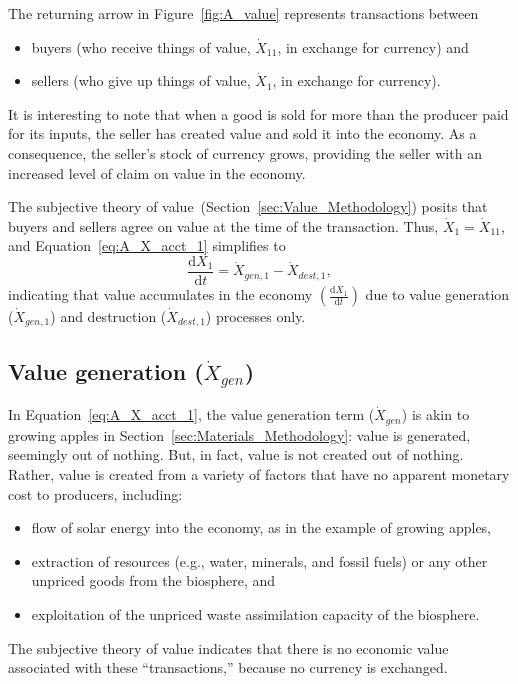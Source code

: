 The returning arrow in Figure~\ref{fig:A_value} 
represents transactions between 
\begin{itemize}
	\item{buyers (who receive things of value, $\dot{X}_{11}$,
	in exchange for currency) and}
	\item{sellers (who give up things of value, $\dot{X}_{1}$,
	in exchange for currency).}
\end{itemize}

It is interesting to note that when a good is sold for more
than the producer paid for its inputs, 
the seller has created value and sold it into the economy. 
As a consequence, the seller's stock of currency grows,
providing the seller with an increased level of claim 
on value in the economy.

The subjective theory of value~(Section~\ref{sec:Value_Methodology})
posits that buyers and sellers agree on value at the 
time of the transaction.
Thus, $\dot{X}_{1} = \dot{X}_{11}$, and Equation~\ref{eq:A_X_acct_1}
simplifies to
%
\begin{equation} \label{eq:A_X_acct_2}	
	\frac{\mathrm{d}X_{1}}{\mathrm{d}t}	
	= \dot{X}_{gen,1}
	- \dot{X}_{dest,1},
\end{equation}
%
indicating that value accumulates in the economy
$\left( \frac{\mathrm{d}X_{1}}{\mathrm{d}t} \right)$
due to value generation ($\dot{X}_{gen,1}$) 
and destruction ($\dot{X}_{dest,1}$) processes only.


\subsection[Value generation]{Value generation ($\dot{X}_{gen}$)}

\noindent In Equation~\ref{eq:A_X_acct_1}, 
the value generation term ($\dot{X}_{gen}$) is akin to growing apples
in Section~\ref{sec:Materials_Methodology}: 
value is generated, seemingly out of nothing.
But, in fact, value is not created out of nothing. 
Rather, value is created from a variety of factors that have no apparent 
monetary cost to producers, including:
%
\begin{itemize}
	\item{flow of solar energy
	into the economy,
	as in the example of growing apples,}
	
	\item{extraction of resources (e.g., water, minerals, and
	fossil fuels) or any other unpriced goods from the biosphere, and}
	
	\item{exploitation of the unpriced waste assimilation capacity of the biosphere.}
\end{itemize}
%
The subjective theory of value indicates that 
there is no economic value associated with these ``transactions,'' 
because no currency is exchanged. 

